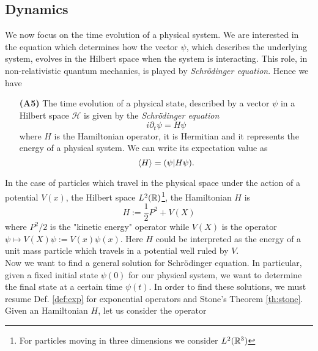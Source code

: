  \subsection{Dynamics}
We now focus on the time evolution of a physical system. We are interested in the equation which determines how the vector $\psi$, which describes the underlying system, evolves in the Hilbert space when the system is interacting. This role, in non-relativistic quantum mechanics, is played by \textit{Schr\"{o}dinger equation}. Hence we have
 \begin{itemize}
 	\item[\textbf{(A5)}] The time evolution of a physical state, described by a vector $\psi$ in a Hilbert space $\mathcal{H}$ is given by the \textit{Schr\"{o}dinger equation}
 	\begin{equation}
 		i\partial_t\psi=H\psi
 	\end{equation}
 	where $H$ is the Hamiltonian operator, it is Hermitian and it represents the energy of a physical system. We can write its expectation value as
 	\begin{equation}
 		\braket{H}=(\psi|H\psi).
 	\end{equation}
 \end{itemize} 
 In the case of particles which travel in the physical space under the action of a potential $V(x)$, the Hilbert space $L^2({\mathbb R})$\footnote{For particles moving in three dimensions we consider $L^2({\mathbb R}^3)$}, the Hamiltonian $H$ is
 \begin{equation}
 	H:=\frac{1}{2}P^2+V(X) 
 	\label{eq:hamiltonian}
 \end{equation}
 where $P^2/2$ is the "kinetic energy" operator while $V(X)$ is the operator $\psi\mapsto V(X)\psi:=V(x)\psi(x)$. Here $H$ could be interpreted as the energy of a unit mass particle which travels in a potential well ruled by $V$.\\
 
  Now we want to find a general solution for Schr\"{o}dinger equation. In particular, given a fixed initial state $\psi(0)$ for our physical system, we want to determine the final state at a certain time $\psi(t)$. In order to find these solutions, we must resume Def. \ref{def:exp} for exponential operators and Stone's Theorem \ref{th:stone}.\\
  Given an Hamiltonian $H$, let us consider the operator
  
